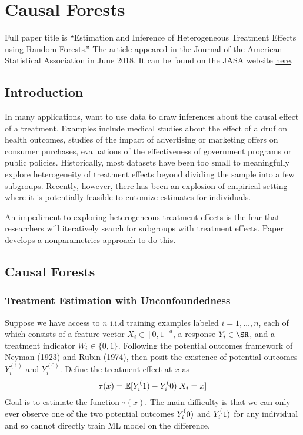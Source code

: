 
\section{Causal Forests }

Full paper title is ``Estimation and Inference of Heterogeneous Treatment Effects using Random Forests.'' The article appeared in the Journal of the American Statistical Association in June 2018. It can be found on the JASA website \href{https://www.tandfonline.com/doi/full/10.1080/01621459.2017.1319839}{here}. 

\subsection{Introduction}

In many applications, want to use data to draw inferences about the causal effect of a treatment. Examples include medical studies about the effect of a druf on health outcomes, studies of the impact of advertising or marketing offers on consumer purchases, evaluations of the effectiveness of government programs or public policies. Historically, most datasets have been too small to meaningfully explore heterogeneity of treatment effects beyond dividing the sample into a few subgroups. Recently, however, there has been an explosion of empirical setting where it is potentially feasible to cutomize estimates for individuals.

An impediment to exploring heterogeneous treatment effects is the fear that researchers will iteratively search for subgroups with treatment effects. Paper develops a nonparametrics approach to do this. 

\subsection{Causal Forests}

\subsubsection{Treatment Estimation with Unconfoundedness}

Suppose we have access to $n$ i.i.d training examples labeled $i = 1,\dots,n$, each of which consists of a feature vector $X_i \in [0,1]^d$, a response $Y_i \in \SR$, and a treatment indicator $W_i \in \{0,1\}.$ Following the potential outcomes framework of Neyman (1923) and Rubin (1974), then posit the existence of potential outcomes $Y_i^{(1)}$ and $Y_i^{(0)}$. Define the treatment effect at $x$ as 
\begin{equation}
	\label{eq:cf-1}
	\tau(x) = \mathbb{E}[Y_i^(1) - Y_i^(0) | X_i = x]
\end{equation}
Goal is to estimate the function $\tau(x)$. The main difficulty is that we can only ever observe one of the two potential outcomes $Y_i^(0)$ and $Y_i^(1)$ for any individual and so cannot directly train ML model on the difference. 

